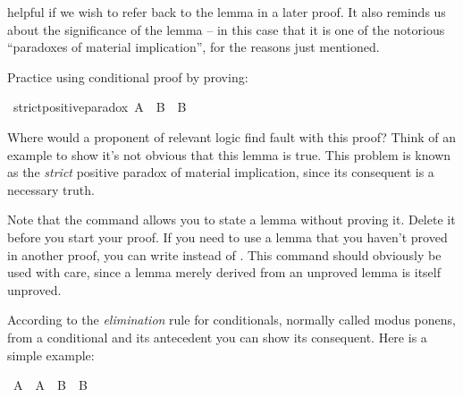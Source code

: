 \begin{isabellebody}
\begin{isamarkuptext}
helpful if we wish to refer back to the lemma in a later proof. It also reminds us about the significance
of the lemma -- in this case that it is one of the notorious ``paradoxes of material implication'',
for the reasons just mentioned.%
\end{isamarkuptext}\isamarkuptrue%
%
\begin{isamarkuptext}%
\begin{Exercise}[title={The Strict Positive Paradox}]
Practice using conditional proof by proving: \end{Exercise}%
\end{isamarkuptext}\isamarkuptrue%
\isamarkupfalse%
\ strict{\isacharunderscore}positive{\isacharunderscore}paradox{\isacharcolon}\ {\isachardoublequoteopen}A\ {\isasymlongrightarrow}\ B\ {\isasymlongrightarrow}\ B{\isachardoublequoteclose}%
\isadelimproof
\ %
\endisadelimproof
%
\isatagproof
{}\isamarkupfalse%
%
\endisatagproof
{\isafoldproof}%
%
\isadelimproof
%
\endisadelimproof
%
\begin{isamarkuptext}%
Where would a proponent of relevant logic find fault with this proof? Think of an example
to show it's not obvious that this lemma is true. This problem is known as the \emph{strict} positive
paradox of material implication, since its consequent  is a necessary truth.%
\end{isamarkuptext}\isamarkuptrue%
%
\begin{isamarkuptext}%
Note that the command  allows you to state a lemma without proving it. Delete 
it before you start your proof. If you need to use a lemma that you haven't proved in another proof, you can
write  instead of . This command should obviously be used with care,
since a lemma merely derived from an unproved lemma is itself unproved.%
\end{isamarkuptext}\isamarkuptrue%
%
\isadelimdocument
%
\endisadelimdocument
%
\isatagdocument
%
\isamarkuptrue%
%
\endisatagdocument
{\isafolddocument}%
%
\isadelimdocument
%
\endisadelimdocument
%
\begin{isamarkuptext}%
According to the \emph{elimination} rule for conditionals, normally called modus ponens,
from a conditional and its antecedent you can show its consequent. Here is a simple example:%
\end{isamarkuptext}\isamarkuptrue%
\isamarkupfalse%
\ {\isachardoublequoteopen}A\ {\isasymlongrightarrow}\ {\isacharparenleft}A\ {\isasymlongrightarrow}\ B{\isacharparenright}\ {\isasymlongrightarrow}\ B{\isachardoublequoteclose}\isanewline

\end{isabellebody}
